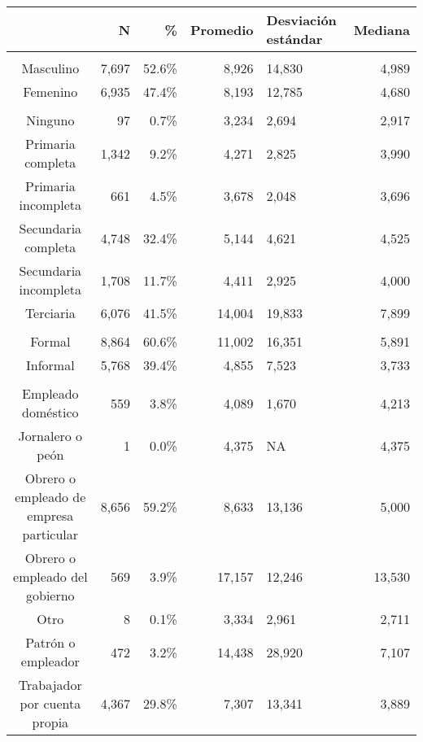 \begin{table}[t]
\fontsize{12.0pt}{14.4pt}\selectfont
\begin{tabular*}{\linewidth}{@{\extracolsep{\fill}}crrrlr}
\toprule
  & N & \% & Promedio & Desviación 
estándar & Mediana \\ 
\midrule\addlinespace[2.5pt]
\multicolumn{6}{l}{Sexo} \\[2.5pt] 
\midrule\addlinespace[2.5pt]
Masculino & 7,697 & 52.6\% & 8,926 & 14,830 & 4,989 \\ 
Femenino & 6,935 & 47.4\% & 8,193 & 12,785 & 4,680 \\ 
\midrule\addlinespace[2.5pt]
\multicolumn{6}{l}{Máximo nivel educativo} \\[2.5pt] 
\midrule\addlinespace[2.5pt]
Ninguno &    97 &  0.7\% &  3,234 &  2,694 & 2,917 \\ 
Primaria completa & 1,342 &  9.2\% &  4,271 &  2,825 & 3,990 \\ 
Primaria incompleta &   661 &  4.5\% &  3,678 &  2,048 & 3,696 \\ 
Secundaria completa & 4,748 & 32.4\% &  5,144 &  4,621 & 4,525 \\ 
Secundaria incompleta & 1,708 & 11.7\% &  4,411 &  2,925 & 4,000 \\ 
Terciaria & 6,076 & 41.5\% & 14,004 & 19,833 & 7,899 \\ 
\midrule\addlinespace[2.5pt]
\multicolumn{6}{l}{Formalidad} \\[2.5pt] 
\midrule\addlinespace[2.5pt]
Formal & 8,864 & 60.6\% & 11,002 & 16,351 & 5,891 \\ 
Informal & 5,768 & 39.4\% &  4,855 &  7,523 & 3,733 \\ 
\midrule\addlinespace[2.5pt]
\multicolumn{6}{l}{Posición ocupacional} \\[2.5pt] 
\midrule\addlinespace[2.5pt]
Empleado doméstico &   559 &  3.8\% &  4,089 &  1,670 &  4,213 \\ 
Jornalero o peón &     1 &  0.0\% &  4,375 &     NA &  4,375 \\ 
Obrero o empleado de empresa particular & 8,656 & 59.2\% &  8,633 & 13,136 &  5,000 \\ 
Obrero o empleado del gobierno &   569 &  3.9\% & 17,157 & 12,246 & 13,530 \\ 
Otro &     8 &  0.1\% &  3,334 &  2,961 &  2,711 \\ 
Patrón o empleador &   472 &  3.2\% & 14,438 & 28,920 &  7,107 \\ 
Trabajador por cuenta propia & 4,367 & 29.8\% &  7,307 & 13,341 &  3,889 \\ 

\end{tabular*}
\end{table}
